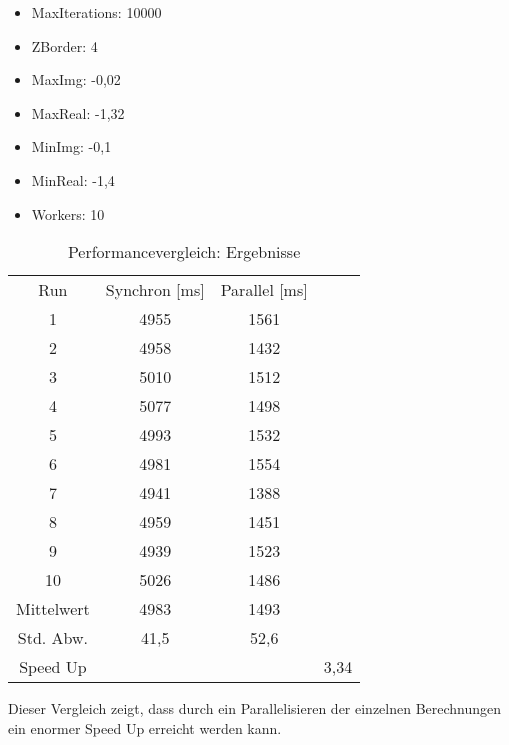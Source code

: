 \documentclass[a4paper,ngerman]{scrartcl}
\begin{document}
\begin{itemize}
	\item MaxIterations: 10000
	\item ZBorder: 4
	\item MaxImg: -0,02
	\item MaxReal: -1,32
	\item MinImg: -0,1
	\item MinReal: -1,4
	\item Workers: 10
\end{itemize}

\begin{table}[!htb]
\centering
\caption{Performancevergleich: Ergebnisse}
\begin{tabular}{cccc}
\hline
                                                                           
Run & Synchron [ms] & Parallel [ms] & \\
1 & 4955 & 1561 & \\
2 & 4958 & 1432 & \\
3 & 5010 & 1512 & \\
4 & 5077 & 1498 & \\
5 & 4993 & 1532 & \\
6 & 4981 & 1554 & \\
7 & 4941 & 1388 & \\
8 & 4959 & 1451 & \\
9 & 4939 & 1523 & \\
10 & 5026 & 1486 & \\ 
Mittelwert    & 4983 & 1493 & \\
Std. Abw.    & 41,5      & 52,6  &\\
Speed Up & & & 3,34

\end{tabular}
\end{table} 

Dieser Vergleich zeigt, dass durch ein Parallelisieren der einzelnen Berechnungen ein enormer Speed Up erreicht werden kann.
\end{document}
